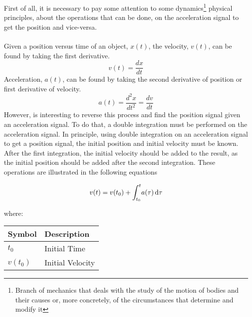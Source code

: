 \documentclass[tesi]{subfiles}
\begin{document}
First of all, it is necessary to pay some attention to some dynamics\footnote{Branch of mechanics that deals with the study of the motion of bodies and their causes or, more concretely, of the circumstances that determine and modify it} physical principles, about the operations that can be done, on the acceleration signal to get the position and vice-versa.\\\\
Given a position versus time of an object, $x(t)$, the velocity, $v(t)$, can be found by taking the first derivative.
\begin{equation}
v(t) = \dfrac{dx}{dt}
\end{equation}\label{eq:velocity}
Acceleration, $a(t)$, can be found by taking the second derivative of position or first
derivative of velocity.
\begin{equation}
a(t) = \dfrac{d^{2}x}{dt^{2}} = \dfrac{dv}{dt}
\end{equation}\label{eq:displacement}
However, is interesting to reverse this process and find the position signal given an acceleration signal. To do that, a double integration must be performed on the acceleration signal.
In principle, using double integration on an acceleration signal to get a position signal, the initial position and initial velocity must be known. After the first integration, the initial velocity should be added to the result, as the initial position should be added after the second integration. These operations are illustrated in the following equations
\begin{center}
\begin{equation}
 {\large v(t) = v(t_{0}) + \int_{t_{0}}^{t} \! a(\tau) \, \mathrm{d}\tau}
\end{equation}

where: 
\begin{table}[ht]
\centering
    \begin{tabular}{ | l | l |}
    
    \hline
    Symbol & Description \\ \hline
   \quad  $t_{0}$ & Initial Time \\ \hline
	   \quad  $v(t_{0})$ & Initial Velocity\\  
\hline 
    \end{tabular}
\end{table}
\end{center}
\end{document}
